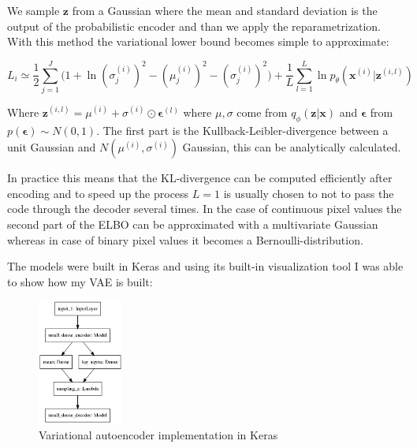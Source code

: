 \documentclass[12pt, english]{article}
\begin{document}
\vspace{4mm}

\par We sample $\bm{z}$ from a Gaussian where the mean and standard deviation is the output of the probabilistic encoder and than we apply the reparametrization. With this method the variational lower bound becomes simple to approximate:

\vspace{4mm}

\begin{equation}
    L_{i} \simeq \frac{1}{2}\sum_{j = 1}^{J}\Big( 1 + \ln(\sigma^{(i)}_{j})^{2} - (\mu^{(i)}_{j})^{2} - (\sigma^{(i)}_{j})^{2} \Big) + \frac{1}{L}\sum_{l=1}^{L}\ln p_{\theta}(\bm{x}^{(i)} | \bm{z}^{(i, l)})
\end{equation}

\vspace{4mm}

\par Where $\bm{z}^{(i, l)} = \mu^{(i)} + \sigma^{(i)} \odot \bm{\epsilon}^{(l)}$ where $\mu, \sigma$ come from $q_{\phi}(\bm{z} | \bm{x})$ and $\bm{\epsilon}$ from $p(\bm{\epsilon}) \sim N(0, 1)$. The first part is the Kullback-Leibler-divergence between a unit Gaussian and $N(\mu^{(i)}, \sigma^{(i)})$ Gaussian, this can be analytically calculated.

\vspace{4mm}

\par In practice this means that the KL-divergence can be computed efficiently after encoding and to speed up the process $L = 1$ is usually chosen to not to pass the code through the decoder several times. In the case of continuous pixel values the second part of the ELBO can be approximated with a multivariate Gaussian whereas in case of binary pixel values it becomes a Bernoulli-distribution. 

\vspace{4mm}

\par The models were built in Keras \cite{chollet2015keras} and using its built-in visualization tool I was able to show how my VAE is built:

\vspace{4mm}

\begin{figure}[H]
    \centering
    \includegraphics[width=0.25\textwidth]{vae_keras.png}
    \caption{Variational autoencoder implementation in Keras}
\end{figure}
\end{document}
